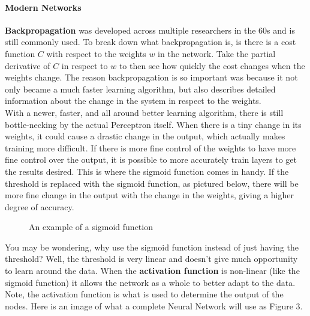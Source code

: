 \documentclass[12pt]{article}
\begin{document}
\paragraph{Modern Networks}
\textbf{Backpropagation} was developed across multiple researchers in the 60s and is still commonly used. To break down what backpropagation is, is there is a cost function $C$ with respect to the weights $w$ in the network. Take the partial derivative of $C$ in respect to $w$ to then see how quickly the cost changes when the weights change. The reason backpropagation is so important was because it not only became a much faster learning algorithm, but also describes detailed information about the change in the system in respect to the weights.  \\

With a newer, faster, and all around better learning algorithm, there is still bottle-necking by the actual Perceptron itself. When there is a tiny change in its weights, it could cause a drastic change in the output, which actually makes training more difficult. If there is more fine control of the weights to have more fine control over the output, it is possible to more accurately train layers to get the results desired. This is where the sigmoid function comes in handy. If the threshold is replaced with the sigmoid function, as pictured below, there will be more fine change in the output with the change in the weights, giving a higher degree of accuracy.

\begin{figure}[H]
    \centering
    \def\svgwidth{\columnwidth}
    
    \caption{An example of a sigmoid function}
\end{figure}

You may be wondering, why use the sigmoid function instead of just having the threshold? Well, the threshold is very linear and doesn't give much opportunity to learn around the data. When the \textbf{activation function} is non-linear (like the sigmoid function) it allows the network as a whole to better adapt to the data. Note, the activation function is what is used to determine the output of the nodes. Here is an image of what a complete Neural Network will use as Figure 3.
\end{document}

